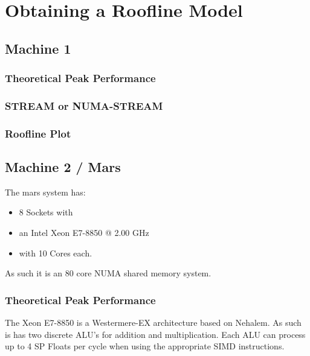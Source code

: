 
\lstset{
	basicstyle=\small,
	language=C
}

\ttfamily\small

\section{Obtaining a Roofline Model}

\subsection{Machine 1}

\subsubsection{Theoretical Peak Performance}

\subsubsection{STREAM or NUMA-STREAM}

\subsubsection{Roofline Plot}


\subsection{Machine 2 / Mars}

The mars system has:
 \begin{itemize}
 	\item 8 Sockets with
	\item an Intel Xeon E7-8850 @ 2.00 GHz
	\item with 10 Cores each.
\end{itemize}

As such it is an 80 core NUMA shared memory system.

\subsubsection{Theoretical Peak Performance}

The Xeon E7-8850 is a Westermere-EX architecture based on Nehalem.\cite{wikichip}
As such is has two discrete ALU's for addition and multiplication.
Each ALU can process up to 4 SP Floats per cycle when using the appropriate SIMD instructions.\cite{agnerorg}

